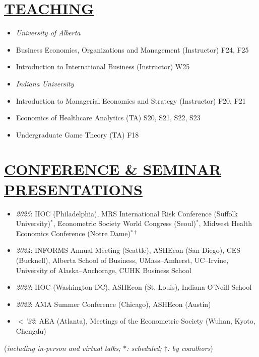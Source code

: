 \documentclass{res}
\begin{document}
\begin{resume}
\section{\large{\ul{TEACHING}}}
\vspace{1.8em}
\begin{itemize}[leftmargin=15pt,labelindent=-15pt,itemindent=-15pt,itemsep=0.1em]
\item[] \textit{University of Alberta}
    \item[] \hspace{13pt} Business Economics, Organizations and Management  (Instructor) \hfill F24, F25
    \item[] \hspace{13pt} Introduction to International Business (Instructor) \hfill W25
\item[] \textit{Indiana University}
    \item[] \hspace{13pt} Introduction to Managerial Economics and Strategy (Instructor) \hfill F20, F21
    \item[] \hspace{13pt} Economics of Healthcare Analytics (TA) \hfill S20, S21, S22, S23
    \item[] \hspace{13pt} Undergraduate Game Theory (TA) \hfill F18
\end{itemize}

\section{\large{\ul{CONFERENCE \& SEMINAR PRESENTATIONS}}}
\vspace{1.8em}
\begin{itemize}[leftmargin=15pt,labelindent=-15pt,itemindent=-15pt,itemsep=0.1em]
\item[] \textit{2025}: IIOC (Philadelphia), MRS International Risk Conference (Suffolk University)$^*$, Econometric Society World Congress (Seoul)$^*$, Midwest Health Economics Conference (Notre Dame)$^{*\dagger}$
\item[] \textit{2024}: INFORMS Annual Meeting (Seattle), ASHEcon (San Diego), CES (Bucknell), Alberta School of Business, UMass–Amherst, UC–Irvine, University of Alaska–Anchorage, CUHK Business School
\item[] \textit{2023}: IIOC (Washington DC), ASHEcon (St. Louis), Indiana O'Neill School 
\item[] \textit{2022}: AMA Summer Conference (Chicago), ASHEcon (Austin) 
\item[] \textit{$<$'22}: AEA (Atlanta), Meetings of the Econometric Society (Wuhan, Kyoto, Chengdu)
\end{itemize}
\hfill {\small (\textit{including in-person and virtual talks; $*$: scheduled; $\dagger$: by coauthors})}

\end{resume}
\end{document}
